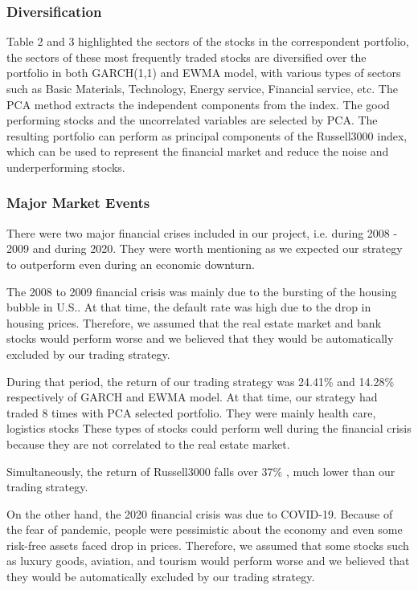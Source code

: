 \documentclass[11pts]{article}
\begin{document}
\subsubsection{Diversification}
\label{sec:org0ef4c10}
Table 2 and 3 highlighted the sectors of the stocks in the correspondent portfolio, the sectors of these most frequently traded stocks are diversified over the portfolio in both GARCH(1,1) and EWMA model, with various types of sectors such as Basic Materials, Technology, Energy service, Financial service, etc. The PCA method extracts the independent components from the index. The good performing stocks and the uncorrelated variables are selected by PCA. The resulting portfolio can perform as principal components of the Russell3000 index, which can be used to represent the financial market and reduce the noise and underperforming stocks.
\subsubsection{Major Market Events}
\label{sec:orgd816dff}

There were two major financial crises included in our project, i.e. during 2008 - 2009 and during 2020. They were worth mentioning as we expected our strategy to outperform even during an economic downturn.

The 2008 to 2009 financial crisis was mainly due to the bursting of the housing bubble in U.S.. At that time, the default rate was high due to the drop in housing prices. Therefore, we assumed that the real estate market and bank stocks would perform worse and we believed that they would be automatically excluded by our trading strategy.

During that period, the return of our trading strategy was 24.41\% and 14.28\% respectively of GARCH and EWMA model. At that time, our strategy had traded 8 times with PCA selected portfolio. They were mainly health care, logistics stocks  These types of stocks could perform well during the financial crisis because they are not correlated to the real estate market.


Simultaneously, the return of Russell3000 falls over 37\%  , much lower than our trading strategy.


On the other hand, the 2020 financial crisis was due to COVID-19. Because of the fear of pandemic, people were pessimistic about the economy and even some risk-free assets faced drop in prices. Therefore, we assumed that some stocks such as luxury goods, aviation, and tourism would perform worse and we believed that they would be automatically excluded by our trading strategy.
\end{document}
